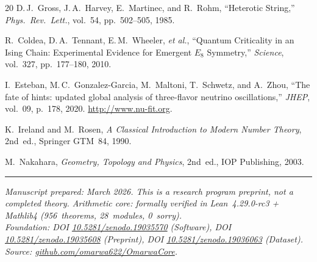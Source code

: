 \documentclass[11pt, a4paper]{article}
\theoremstyle{plain}
\theoremstyle{definition}
\theoremstyle{remark}
\begin{document}
\begin{thebibliography}{20}
D.\,J.~Gross, J.\,A.~Harvey, E.~Martinec, and R.~Rohm,
``Heterotic String,''
\textit{Phys.\ Rev.\ Lett.}, vol.~54, pp.~502--505, 1985.

R.~Coldea, D.\,A.~Tennant, E.\,M.~Wheeler, \textit{et al.},
``Quantum Criticality in an Ising Chain:
Experimental Evidence for Emergent $E_8$ Symmetry,''
\textit{Science}, vol.~327, pp.~177--180, 2010.

I.~Esteban, M.\,C.~Gonzalez-Garcia, M.~Maltoni,
T.~Schwetz, and A.~Zhou,
``The fate of hints: updated global analysis of three-flavor
neutrino oscillations,''
\textit{JHEP}, vol.~09, p.~178, 2020.
\url{http://www.nu-fit.org}.

K.~Ireland and M.~Rosen,
\textit{A Classical Introduction to Modern Number Theory}, 2nd~ed.,
Springer GTM~84, 1990.

M.~Nakahara,
\textit{Geometry, Topology and Physics}, 2nd~ed.,
IOP Publishing, 2003.

\end{thebibliography}

\bigskip
\noindent\rule{\textwidth}{0.4pt}

\smallskip
{\small\noindent\textit{Manuscript prepared: March 2026.
This is a research program preprint, not a completed theory.
Arithmetic core: formally verified in Lean~4.29.0-rc3 + Mathlib4
(956~theorems, 28~modules, 0~sorry).}\\
\textit{Foundation:
DOI \href{https://doi.org/10.5281/zenodo.19035570}{10.5281/zenodo.19035570} (Software),
DOI \href{https://doi.org/10.5281/zenodo.19035608}{10.5281/zenodo.19035608} (Preprint),
DOI \href{https://doi.org/10.5281/zenodo.19036063}{10.5281/zenodo.19036063} (Dataset).}\\
\textit{Source:
\href{https://github.com/omarwa622/OmarwaCore}{github.com/omarwa622/OmarwaCore}.}}
\end{document}
